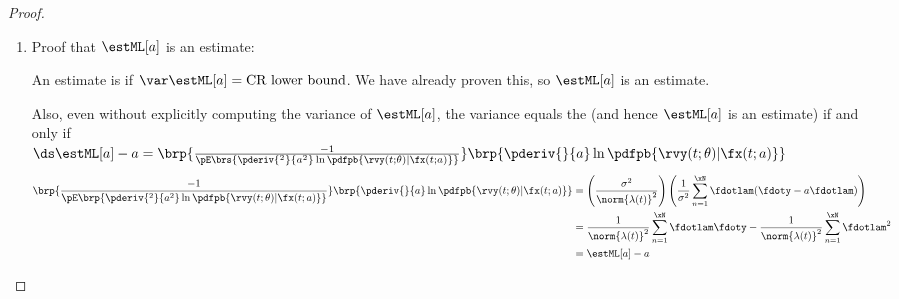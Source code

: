 \begin{proof}
\begin{enumerate}
\item Proof that $\estML[a]$ is an  estimate:

An estimate is  if
$\var\estML[a]=\mbox{CR lower bound}$.
We have already proven this, so $\estML[a]$ is an  estimate.

Also, even without explicitly computing the variance of $\estML[a]$,
the variance equals the 
(and hence $\estML[a]$ is an  estimate)
if and only if
\\\indentx$\ds\estML[a] -  a =
   \brp{\frac{-1}{\pE\brs{
              \pderiv{^2}{ a^2} \ln \pdfpb{\rvy(t;\theta)|\fx(t; a)}
           }}}
   \brp{\pderiv{}{ a} \ln \pdfpb{\rvy(t;\theta)|\fx(t; a)}}
  $
\begin{align*}
   \brp{\frac{-1}{\pE\brp{\pderiv{^2}{ a^2} \ln \pdfpb{\rvy(t;\theta)|\fx(t; a)}}}}
   \brp{\pderiv{}{ a} \ln \pdfpb{\rvy(t;\theta)|\fx(t; a)}}
     &= \left(\frac{\sigma^2}{\norm{\lambda(t)}^2}\right)
         \left(
           \frac{1}{\sigma^2} \sum_{n=1}^\xN \fdotlam( \fdoty - a \fdotlam)
         \right)
   \\&= \frac{1}{\norm{\lambda(t)}^2} \sum_{n=1}^\xN \fdotlam \fdoty -
         \frac{1}{\norm{\lambda(t)}^2} \sum_{n=1}^\xN \fdotlam^2
   \\&= \estML[a] - a
\end{align*}
\end{enumerate}
\end{proof}

